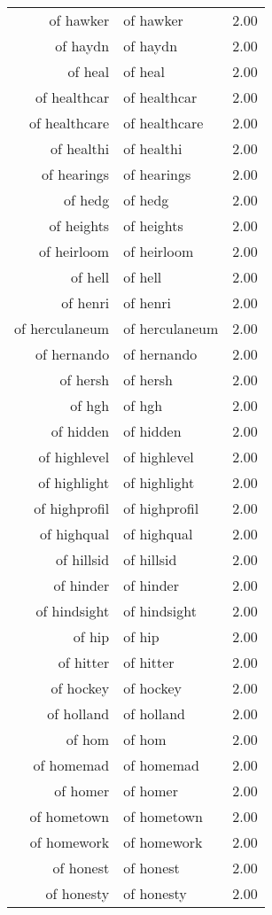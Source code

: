 \begin{table}[ht]
\begin{tabular}{rlr}
  of hawker & of hawker & 2.00 \\ 
  of haydn & of haydn & 2.00 \\ 
  of heal & of heal & 2.00 \\ 
  of healthcar & of healthcar & 2.00 \\ 
  of healthcare & of healthcare & 2.00 \\ 
  of healthi & of healthi & 2.00 \\ 
  of hearings & of hearings & 2.00 \\ 
  of hedg & of hedg & 2.00 \\ 
  of heights & of heights & 2.00 \\ 
  of heirloom & of heirloom & 2.00 \\ 
  of hell & of hell & 2.00 \\ 
  of henri & of henri & 2.00 \\ 
  of herculaneum & of herculaneum & 2.00 \\ 
  of hernando & of hernando & 2.00 \\ 
  of hersh & of hersh & 2.00 \\ 
  of hgh & of hgh & 2.00 \\ 
  of hidden & of hidden & 2.00 \\ 
  of highlevel & of highlevel & 2.00 \\ 
  of highlight & of highlight & 2.00 \\ 
  of highprofil & of highprofil & 2.00 \\ 
  of highqual & of highqual & 2.00 \\ 
  of hillsid & of hillsid & 2.00 \\ 
  of hinder & of hinder & 2.00 \\ 
  of hindsight & of hindsight & 2.00 \\ 
  of hip & of hip & 2.00 \\ 
  of hitter & of hitter & 2.00 \\ 
  of hockey & of hockey & 2.00 \\ 
  of holland & of holland & 2.00 \\ 
  of hom & of hom & 2.00 \\ 
  of homemad & of homemad & 2.00 \\ 
  of homer & of homer & 2.00 \\ 
  of hometown & of hometown & 2.00 \\ 
  of homework & of homework & 2.00 \\ 
  of honest & of honest & 2.00 \\ 
  of honesty & of honesty & 2.00 \\ 

\end{tabular}
\end{table}
